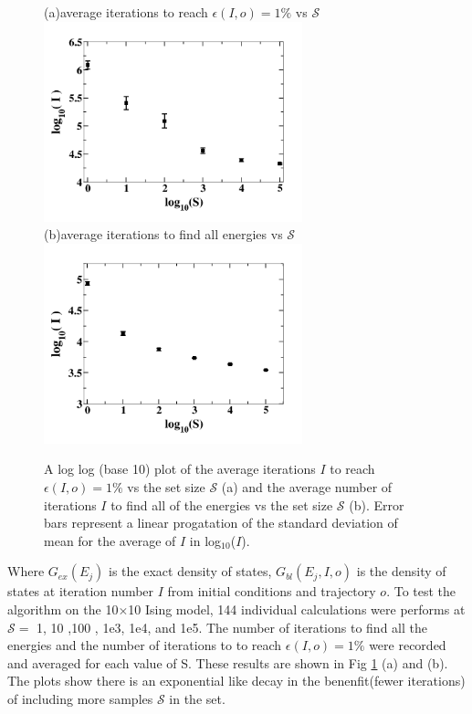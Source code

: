 \documentclass[aps,prl,reprint,superscriptaddress,showkeys]{revtex4-1}
\begin{document}
\begin{figure}[h!]
(a)\hspace{0.1cm}average iterations to reach $\epsilon(I,o)=1\%$ vs $\mathcal{S}$\\
\includegraphics[width=7.5cm]{its_vs_S.png}\\
(b)\hspace{0.1cm}average iterations to find all energies vs $\mathcal{S}$\\
\includegraphics[width=7.5cm]{its_to_find.png}
\caption{\label{its_to}A log log (base 10) plot of the average iterations $I$ to reach $\epsilon(I,o)=1\%$ vs the set size $\mathcal{S}$ (a) and the average number of iterations $I$ to find all of the energies vs the set size $\mathcal{S}$ (b). Error bars represent a linear progatation of the standard deviation of mean for the average of $I$ in log$_{10}$($I$). }
\end{figure}
Where $G_{ex}(E_j)$ is the exact density of states, $G_{bl}(E_j,I,o)$ is the density of states at iteration number $I$ from initial conditions and trajectory $o$. To test the algorithm on the 10$\times$10 Ising model, 144 individual calculations were performs at  $\mathcal{S}=$ 1, 10 ,100 , 1e3,  1e4, and 1e5. The number of iterations to find all the energies and the number of iterations to to reach $\epsilon(I,o)=1\%$ were recorded and averaged for each value of S. These results are shown in Fig \ref{its_to}  (a) and (b).  The plots show there is an exponential like decay in the benenfit(fewer iterations) of including more samples $\mathcal{S}$ in the set.  
\end{document}

